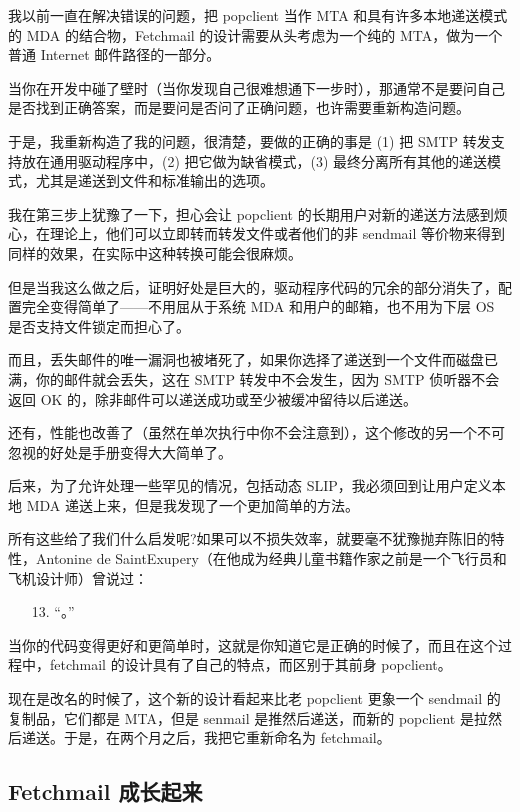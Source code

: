 我以前一直在解决错误的问题，把 popclient 当作 MTA 和具有许多本地递送模式的 MDA 的结合物，Fetchmail 的设计需要从头考虑为一个纯的 MTA，做为一个普通 Internet 邮件路径的一部分。


当你在开发中碰了壁时（当你发现自己很难想通下一步时），那通常不是要问自己是否找到正确答案，而是要问是否问了正确问题，也许需要重新构造问题。


于是，我重新构造了我的问题，很清楚，要做的正确的事是 (1) 把 SMTP 转发支持放在通用驱动程序中，(2) 把它做为缺省模式，(3) 最终分离所有其他的递送模式，尤其是递送到文件和标准输出的选项。


我在第三步上犹豫了一下，担心会让 popclient 的长期用户对新的递送方法感到烦心，在理论上，他们可以立即转而转发文件或者他们的非 sendmail 等价物来得到同样的效果，在实际中这种转换可能会很麻烦。

但是当我这么做之后，证明好处是巨大的，驱动程序代码的冗余的部分消失了，配置完全变得简单了——不用屈从于系统 MDA 和用户的邮箱，也不用为下层 OS 是否支持文件锁定而担心了。


而且，丢失邮件的唯一漏洞也被堵死了，如果你选择了递送到一个文件而磁盘已满，你的邮件就会丢失，这在 SMTP 转发中不会发生，因为 SMTP 侦听器不会返回 OK 的，除非邮件可以递送成功或至少被缓冲留待以后递送。


还有，性能也改善了（虽然在单次执行中你不会注意到），这个修改的另一个不可忽视的好处是手册变得大大简单了。


后来，为了允许处理一些罕见的情况，包括动态 SLIP，我必须回到让用户定义本地 MDA 递送上来，但是我发现了一个更加简单的方法。


所有这些给了我们什么启发呢?如果可以不损失效率，就要毫不犹豫抛弃陈旧的特性，Antonine de SaintExupery（在他成为经典儿童书籍作家之前是一个飞行员和飞机设计师）曾说过：

\begin{enumerate}
\item[13.] “。”
\end{enumerate}

当你的代码变得更好和更简单时，这就是你知道它是正确的时候了，而且在这个过程中，fetchmail 的设计具有了自己的特点，而区别于其前身 popclient。


现在是改名的时候了，这个新的设计看起来比老 popclient 更象一个 sendmail 的复制品，它们都是 MTA，但是 senmail 是推然后递送，而新的 popclient 是拉然后递送。于是，在两个月之后，我把它重新命名为 fetchmail。


\subsection{Fetchmail 成长起来}


